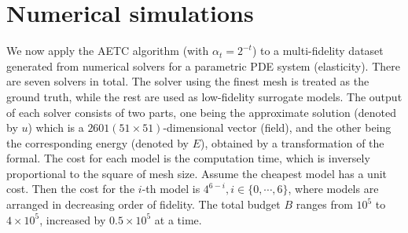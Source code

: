 \documentclass[a4paper,11pt]{article}
\numberwithin{equation}{section}
\theoremstyle{plain}
\theoremstyle{definition}
\def\R{{\mathbb R}}
\def\R{{\mathbb R}}
\begin{document}
%

 








\section{Numerical simulations}

We now apply the AETC algorithm (with $\alpha_t = 2^{-t}$) to a multi-fidelity dataset generated from numerical solvers for a parametric PDE system (elasticity). 
There are seven solvers in total. 
The solver using the finest mesh is treated as the ground truth, while the rest are used as low-fidelity surrogate models. 
The output of each solver consists of two parts, one being the approximate solution (denoted by $u$) which is a $2601 (51\times 51)$-dimensional vector (field), and the other being the corresponding energy (denoted by $E$), obtained by a transformation of the formal. 
The cost for each model is the computation time, which is inversely proportional to the square of mesh size. 
Assume the cheapest model has a unit cost. Then the cost for the $i$-th model is $4^{6-i}, i\in \{0,\cdots, 6\}$, where models are arranged in decreasing order of fidelity.  
The total budget $B$ ranges from $10^5$ to $4\times 10^5$, increased by $0.5\times 10^5$ at a time. 
\end{document}
